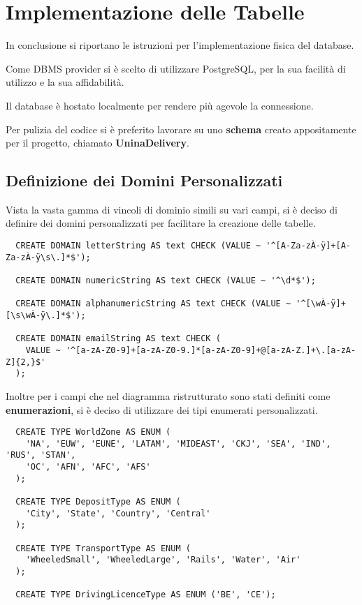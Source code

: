 \chapter{Implementazione delle Tabelle}

In conclusione si riportano le istruzioni per l'implementazione fisica del database.

Come DBMS provider si è scelto di utilizzare PostgreSQL, per la sua facilità di utilizzo e la sua affidabilità.

Il database è hostato localmente per rendere più agevole la connessione.

Per pulizia del codice si è preferito lavorare su uno \textbf{schema} creato appositamente per il progetto, chiamato \textbf{UninaDelivery}.

\section{Definizione dei Domini Personalizzati}

Vista la vasta gamma di vincoli di dominio simili su vari campi, si è deciso di definire dei domini personalizzati per facilitare la creazione delle tabelle.

\begin{lstlisting}
  CREATE DOMAIN letterString AS text CHECK (VALUE ~ '^[A-Za-zÀ-ÿ]+[A-Za-zÀ-ÿ\s\.]*$');
  
  CREATE DOMAIN numericString AS text CHECK (VALUE ~ '^\d*$');
  
  CREATE DOMAIN alphanumericString AS text CHECK (VALUE ~ '^[\wÀ-ÿ]+[\s\wÀ-ÿ\.]*$');
  
  CREATE DOMAIN emailString AS text CHECK (
    VALUE ~ '^[a-zA-Z0-9]+[a-zA-Z0-9.]*[a-zA-Z0-9]+@[a-zA-Z.]+\.[a-zA-Z]{2,}$'
  );
\end{lstlisting}

Inoltre per i campi che nel diagramma ristrutturato sono stati definiti come \textbf{enumerazioni}, si è deciso di utilizzare dei tipi enumerati personalizzati.

\begin{lstlisting}
  CREATE TYPE WorldZone AS ENUM (
    'NA', 'EUW', 'EUNE', 'LATAM', 'MIDEAST', 'CKJ', 'SEA', 'IND', 'RUS', 'STAN', 
    'OC', 'AFN', 'AFC', 'AFS'
  );

  CREATE TYPE DepositType AS ENUM (
    'City', 'State', 'Country', 'Central'
  );

  CREATE TYPE TransportType AS ENUM (
    'WheeledSmall', 'WheeledLarge', 'Rails', 'Water', 'Air'
  );
  
  CREATE TYPE DrivingLicenceType AS ENUM ('BE', 'CE');
\end{lstlisting}

